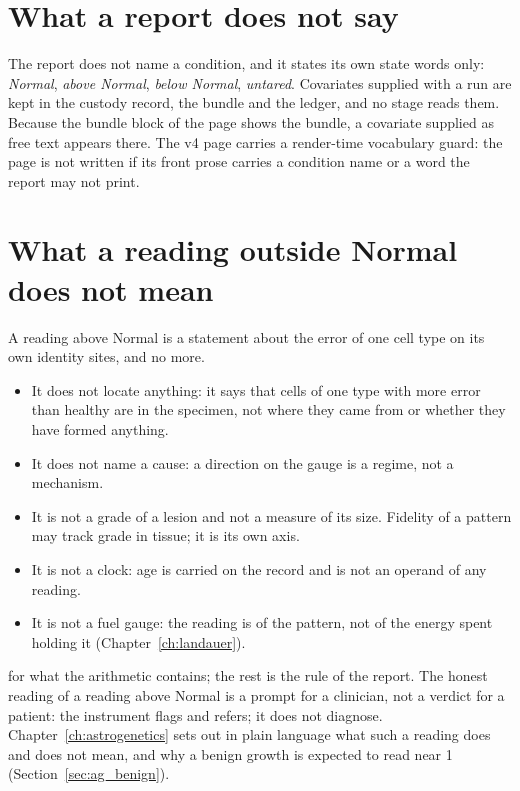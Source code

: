 

\section{What a report does not say}

The report does not name a condition, and it states its own state words only: \emph{Normal}, \emph{above Normal}, \emph{below Normal}, \emph{untared}. Covariates
supplied with a run are kept in the custody record, the bundle and the ledger, and no stage reads them. Because the bundle block of the
page shows the bundle, a covariate supplied as free text appears there. The v4 page carries a render-time vocabulary guard: the page is not written if its front prose carries a condition name or a word the report may not print.



\section{What a reading outside Normal does not mean}\label{sec:p4notmean}

A reading above Normal is a statement about the error of one cell type on its own identity sites, and no more.
\begin{itemize}
\item It does not locate anything: it says that cells of one type with more error than healthy are in the specimen, not where they came
      from or whether they have formed anything.
\item It does not name a cause: a direction on the gauge is a regime, not a mechanism.
\item It is not a grade of a lesion and not a measure of its size. Fidelity of a pattern may track grade in tissue; it is its own axis.
\item It is not a clock: age is carried on the record and is not an operand of any reading.
\item It is not a fuel gauge: the reading is of the pattern, not of the energy spent holding it (Chapter~\ref{ch:landauer}).
\end{itemize}
\derived{} for what the arithmetic contains; the rest is the rule of the report.
The honest reading of a reading above Normal is a prompt for a clinician, not a verdict for a patient: the instrument flags and refers; it
does not diagnose. Chapter~\ref{ch:astrogenetics} sets out in plain language what such a reading does and does not mean, and why a benign
growth is expected to read near 1 (Section~\ref{sec:ag_benign}).

